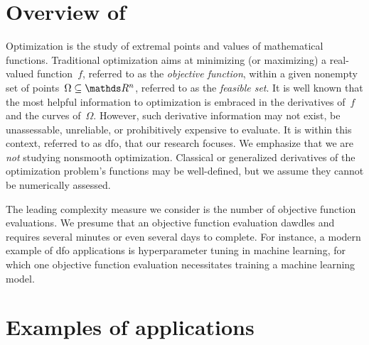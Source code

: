 \section{Overview of }

Optimization is the study of extremal points and values of mathematical functions.
Traditional optimization aims at minimizing (or maximizing) a real-valued function~$f$, referred to as the \emph{objective function}, within a given nonempty set of points~$\Omega \subseteq \R^n$, referred to as the \emph{feasible set}.
It is well known that the most helpful information to optimization is embraced in the derivatives of~$f$ and the curves of~$\Omega$.
However, such derivative information may not exist, be unassessable, unreliable, or prohibitively expensive to evaluate.
It is within this context, referred to as \gls{dfo}, that our research focuses.
We emphasize that we are \emph{not} studying nonsmooth optimization.
Classical or generalized derivatives of the optimization problem's functions may be well-defined, but we assume they cannot be numerically assessed.

The leading complexity measure we consider is the number of objective function evaluations.
We presume that an objective function evaluation dawdles and requires several minutes or even several days to complete.
For instance, a modern example of \gls{dfo} applications is hyperparameter tuning in machine learning, for which one objective function evaluation necessitates training a machine learning model.

\section{Examples of  applications}

